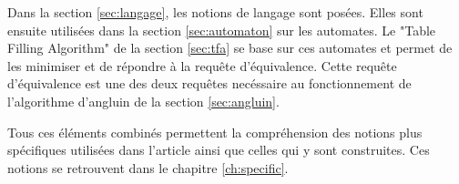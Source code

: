 Dans la section \ref{sec:langage}, les notions de langage sont posées. Elles sont ensuite utilisées dans la section \ref{sec:automaton} sur les automates. Le "Table Filling Algorithm" de la section \ref{sec:tfa} se base sur ces automates et permet de les minimiser et de répondre à la requête d'équivalence. Cette requête d'équivalence est une des deux requêtes necéssaire au fonctionnement de l'algorithme d'angluin de la section \ref{sec:angluin}.

Tous ces éléments combinés permettent la compréhension des notions plus spécifiques utilisées dans l'article \cite{Vardhan04} ainsi que celles qui y sont construites. Ces notions se retrouvent dans le chapitre \ref{ch:specific}.
